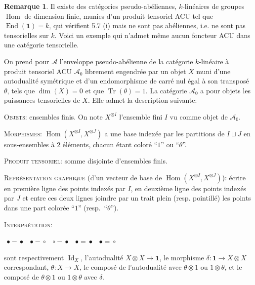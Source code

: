 \documentclass[11pt,a4paper]{article}
\theoremstyle{plain}
\theoremstyle{definition}
\newtheorem{remark}[theorem]{Remarque}
\DeclareMathOperator{\Hom}{Hom}
\DeclareMathOperator{\End}{End}
\DeclareMathOperator{\Tr}{Tr}
\DeclareMathOperator{\Id}{Id}
\begin{document}
\begin{remark}
Il existe des cat\'egories pseudo-ab\'eliennes, $k$-lin\'eaires de groupes $\Hom$ de dimension finie, munies d'un produit tensoriel ACU tel que $\End(\mathbf{1}) = k$, qui v\'erifient 5.7 (i) mais ne sont pas ab\'eliennes, i.e. ne sont pas tensorielles sur $k$. Voici un exemple qui n'admet m\^eme aucun foncteur ACU dans une cat\'egorie tensorielle.

On prend pour $\mathcal{A}$ l'enveloppe pseudo-ab\'elienne de la cat\'egorie $k$-lin\'eaire \`a produit tensoriel ACU $\mathcal{A}_0$ librement engendr\'ee par un objet $X$ muni d'une autodualit\'e sym\'etrique et d'un endomorphisme de carr\'e nul \'egal \`a son transpos\'e $\theta$, tels que $\dim(X) = 0$ et que $\Tr(\theta) = 1$. La cat\'egorie $\mathcal{A}_0$ a pour objets les puissances tensorielles de $X$. Elle admet la description suivante:

\textsc{Objets}: ensembles finis. On note $X^{\otimes I}$ l'ensemble fini $I$ vu comme objet de $\mathcal{A}_0$.

\textsc{Morphismes}: $\Hom(X^{\otimes I}, X^{\otimes J})$ a une base index\'ee par les partitions de $I \sqcup J$ en sous-ensembles \`a 2 \'el\'ements, chacun \'etant color\'e ``$1$'' ou ``$\theta$''.

\textsc{Produit tensoriel}: somme disjointe d'ensembles finis.

\textsc{Repr\'esentation graphique} (d'un vecteur de base de $\Hom(X^{\otimes I}, X^{\otimes J})$): \'ecrire en premi\`ere ligne des points index\'es par $I$, en deuxi\`eme ligne des points index\'es par $J$ et entre ces deux lignes joindre par un trait plein (resp. pointill\'e) les points dans une part color\'ee ``$1$'' (resp.~``$\theta$'').

\textsc{Interpr\'etation}:

\begin{center}
$\begin{array}{ccccc}
\bullet\!\!\!-\!\!\!\bullet & \bullet\!\!\!-\!\!\!\circ & \circ\!\!\!-\!\!\!\bullet & \bullet\!\!\!=\!\!\!\bullet & \bullet\!\!\!=\!\!\!\circ
\end{array}$
\end{center}

sont respectivement $\Id_X$, l'autodualit\'e $X \otimes X \to \mathbf{1}$, le morphisme $\delta : \mathbf{1} \to X \otimes X$ correspondant, $\theta : X \to X$, le compos\'e de l'autodualit\'e avec $\theta \otimes 1$ ou $1 \otimes \theta$, et le compos\'e de $\theta \otimes 1$ ou $1 \otimes \theta$ avec $\delta$.


\end{remark}
\end{document}
